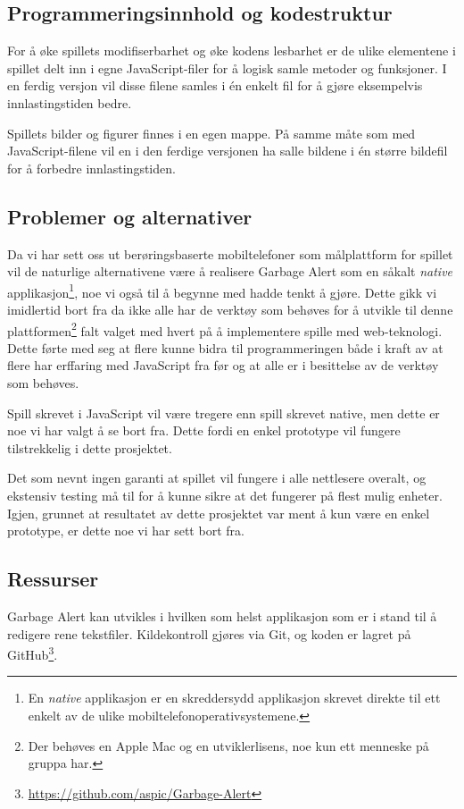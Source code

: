 \subsection{Programmeringsinnhold og kodestruktur}

For å øke spillets modifiserbarhet og øke kodens lesbarhet er de ulike elementene i spillet delt inn i egne JavaScript-filer for å logisk samle metoder og funksjoner. I en ferdig versjon vil disse filene samles i én enkelt fil for å gjøre eksempelvis innlastingstiden bedre.

Spillets bilder og figurer finnes i en egen mappe. På samme måte som med JavaScript-filene vil en i den ferdige versjonen ha salle bildene i én større bildefil for å forbedre innlastingstiden.


\subsection{Problemer og alternativer}
Da vi har sett oss ut berøringsbaserte mobiltelefoner som målplattform for spillet vil de naturlige alternativene være å realisere Garbage Alert som en såkalt \emph{native} applikasjon\footnote{En \emph{native} applikasjon er en skreddersydd applikasjon skrevet direkte til ett enkelt av de ulike mobiltelefonoperativsystemene.}, noe vi også til å begynne med hadde tenkt å gjøre. Dette gikk vi imidlertid bort fra da ikke alle har de verktøy som behøves for å utvikle til denne plattformen\footnote{Der behøves en Apple Mac og en utviklerlisens, noe kun ett menneske på gruppa har.} falt valget med hvert på å implementere spille med web-teknologi. Dette førte med seg at flere kunne bidra til programmeringen både i kraft av at flere har erffaring med JavaScript fra før og at alle er i besittelse av de verktøy som behøves.

Spill skrevet i JavaScript vil være tregere enn spill skrevet native, men dette er noe vi har valgt å se bort fra. Dette fordi en enkel prototype vil fungere tilstrekkelig i dette prosjektet.

Det som nevnt ingen garanti at spillet vil fungere i alle nettlesere overalt, og ekstensiv testing må til for å kunne sikre at det fungerer på flest mulig enheter. Igjen, grunnet at resultatet av dette prosjektet var ment å kun være en enkel prototype, er dette noe vi har sett bort fra.




\subsection{Ressurser}
Garbage Alert kan utvikles i hvilken som helst applikasjon som er i stand til å redigere rene tekstfiler. Kildekontroll gjøres via Git, og koden er lagret på GitHub\footnote{\url{https://github.com/aspic/Garbage-Alert}}.





